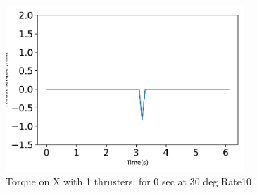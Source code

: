 \begin{figure}[htbp]\centerline{\includegraphics[width=0.8\textwidth]{AutoTeX/Torque_1Thrusters_0s_30deg_Loc2_Rate10}}\caption{Torque on X with 1 thrusters, for 0 sec at 30 deg Rate10}\label{fig:Torque_1Thrusters_0s_30deg_Loc2_Rate10}\end{figure}